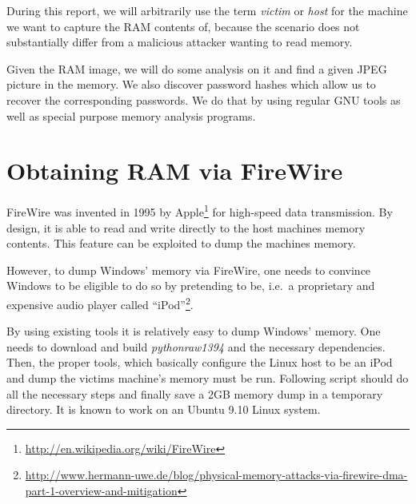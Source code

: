 \documentclass[a4paper,
    11pt,
    normalheadings,
    parindent,
    UKenglish,
    abstracton,
    ]{scrartcl}
\newcommand{\FIXME}[1]{\mbox{}\marginpar{\footnotesize\raggedright\hspace{0pt}\color{red}\emph{#1}}}
\begin{document}
During this report, we will arbitrarily use the term \emph{victim} or \emph{host} for the machine we want to capture the RAM contents of, because the scenario does not substantially differ from a malicious attacker wanting to read memory.

Given the RAM image, we will do some analysis on it and find a given JPEG picture in the memory.
We also discover password hashes which allow us to recover the corresponding passwords.
We do that by using regular GNU tools as well as special purpose memory analysis programs.



\section{Obtaining RAM via FireWire}
FireWire was invented in 1995 by Apple\footnote{\url{http://en.wikipedia.org/wiki/FireWire}} for high-speed data transmission.
By design, it is able to read and write directly to the host machines memory contents.
This feature can be exploited to dump the machines memory.

However, to dump Windows' memory via FireWire, one needs to convince Windows to be eligible to do so by pretending to be, i.e.\, a proprietary and expensive audio player called ``iPod''\footnote{\url{http://www.hermann-uwe.de/blog/physical-memory-attacks-via-firewire-dma-part-1-overview-and-mitigation}}.

By using existing tools it is relatively easy to dump Windows' memory.
One needs to download and build \emph{pythonraw1394} and the necessary dependencies.
Then, the proper tools, which basically configure the Linux host to be an iPod and dump the victims machine's memory must be run.
Following script should do all the necessary steps and finally save a 2GB memory dump in a temporary directory.
It is known to work on an Ubuntu 9.10 Linux system.
%    
\end{document}
